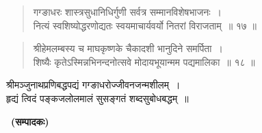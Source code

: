 \begin{verse}
गग्ङाधरः शास्त्रसुधानिधिर्गुणी सर्वत्र सम्मानविशेषभाजनः~।\\
नित्यं स्वशिष्योद्धरणोद्यतः स्वयमाचार्यवर्यो नितरां विराजताम्~॥ १७ ॥
\end{verse}

\begin{verse}
श्रीहेमलम्बस्य च माघकृष्णके चैकादशी भानुदिने समर्पिता~।\\
शिष्यैः कृतेऽस्मिन्नभिनन्दनोत्सवे मोदायभूयान्मम पद्यमालिका~॥ १८ ॥
\end{verse}


\begin{center}
श्रीमञ्जुनाथप्रणिबद्धपद्यं गग्ङाधरोज्जीवनजन्मशीलम्~।\\
हृद्यं त्विदं पङ्कजलोलमालं सुसङ्गतं शब्दसुबोधबद्धम्~॥
\end{center}

~\hfill\textbf{(सम्पादकः)}

\articleend
